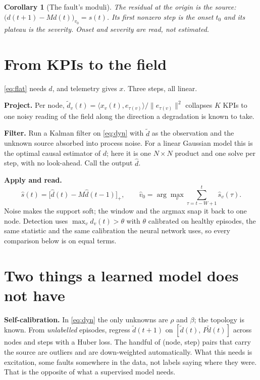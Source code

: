 \documentclass[11pt,a4paper]{article}
\newtheorem{corollary}{Corollary}
\begin{document}
\begin{corollary}[The fault's moduli]
The residual at the origin \emph{is} the source: $\big(d(t{+}1)-Md(t)\big)_{v_0}=s(t)$. Its first
nonzero step is the onset $t_0$ and its plateau is the severity. Onset and severity are read, not
estimated.
\end{corollary}

\section{From KPIs to the field}
\eqref{eq:flat} needs $d$, and telemetry gives $x$. Three steps, all linear.

\textbf{Project.} Per node, $\tilde d_v(t)=\langle x_v(t),e_{\tau(v)}\rangle/\|e_{\tau(v)}\|^2$
collapses $K$ KPIs to one noisy reading of the field along the direction a degradation is known
to take.

\textbf{Filter.} Run a Kalman filter on \eqref{eq:dyn} with $\tilde d$ as the observation and the
unknown source absorbed into process noise. For a linear Gaussian model this is the optimal causal
estimator of $d$; here it is one $N\times N$ product and one solve per step, with no look-ahead.
Call the output $\hat d$.

\textbf{Apply and read.}
\begin{equation}
\hat s(t)=\big[\hat d(t)-M\hat d(t{-}1)\big]_+,\qquad
\hat v_0=\arg\max_v\sum_{\tau=t-W+1}^{t}\hat s_v(\tau).
\label{eq:readoff}
\end{equation}
Noise makes the support soft; the window and the argmax snap it back to one node. Detection uses
$\max_v\hat d_v(t)>\theta$ with $\theta$ calibrated on healthy episodes, the same statistic and the
same calibration the neural network uses, so every comparison below is on equal terms.

\section{Two things a learned model does not have}
\textbf{Self-calibration.} In \eqref{eq:dyn} the only unknowns are $\rho$ and $\beta$; the topology
is known. From \emph{unlabelled} episodes, regress $\tilde d(t{+}1)$ on $[\tilde d(t),\,P\tilde d(t)]$
across nodes and steps with a Huber loss. The handful of (node, step) pairs that carry the source are
outliers and are down-weighted automatically. What this needs is excitation, some faults somewhere
in the data, not labels saying where they were. That is the opposite of what a supervised model
needs.
\end{document}
